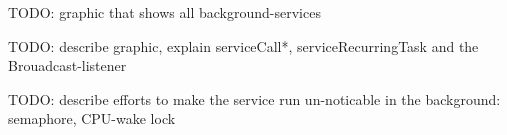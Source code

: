 TODO: graphic that shows all  background-services

TODO: describe graphic, explain serviceCall*, serviceRecurringTask and the Brouadcast-listener

TODO: describe efforts to make the service run un-noticable in the background: semaphore, CPU-wake lock 